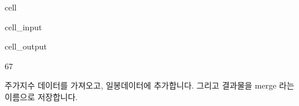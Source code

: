 \documentclass[letterpaper,10pt,english]{jupyterBook}
\begin{document}
\begin{sphinxuseclass}{cell}
\begin{sphinxVerbatimInput}
\begin{sphinxuseclass}{cell_input}
\end{sphinxuseclass}\end{sphinxVerbatimInput}
\begin{sphinxVerbatimOutput}

\begin{sphinxuseclass}{cell_output}
\begin{sphinxVerbatim}[commandchars=\\\{\}]
67
\end{sphinxVerbatim}

\end{sphinxuseclass}\end{sphinxVerbatimOutput}

\end{sphinxuseclass}
\sphinxAtStartPar
 주가지수 데이터를 가져오고, 일봉데이터에 추가합니다. 그리고 결과물을 merge 라는 이름으로 저장합니다.
\end{document}
